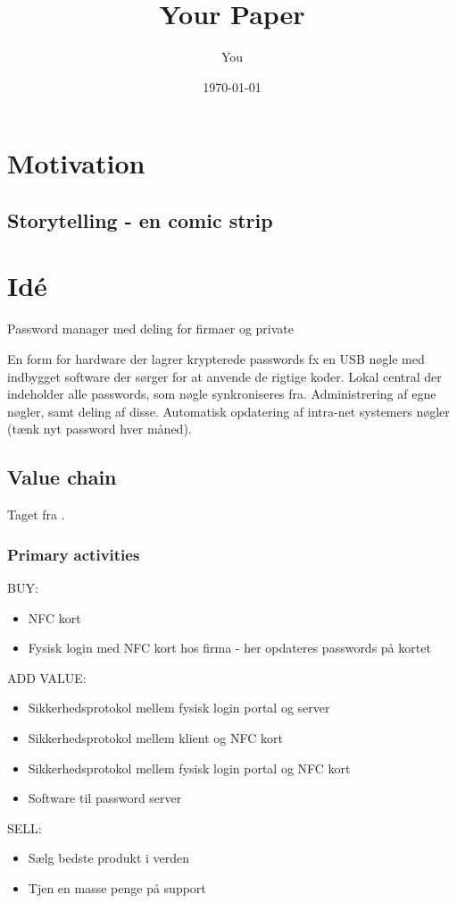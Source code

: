 \documentclass[a4paper]{article}
\title{Your Paper}
\author{You}
\date{\today}
\begin{document}
\maketitle

\section{Motivation}
\subsection{Storytelling - en comic strip}

\section{Idé}

Password manager med deling for firmaer og private

En form for hardware der lagrer krypterede passwords fx en USB nøgle med indbygget software der sørger for at anvende de rigtige koder.
Lokal central der indeholder alle passwords, som nøgle synkroniseres fra.
Administrering af egne nøgler, samt deling af disse.
Automatisk opdatering af intra-net systemers nøgler (tænk nyt password hver måned).

\subsection{Value chain}
Taget fra \citet[p.~12]{rose2012software}.
\subsubsection*{Primary activities}
BUY:
\begin{itemize}
\item NFC kort
\item Fysisk login med NFC kort hos firma - her opdateres passwords på kortet
\end{itemize}
ADD VALUE:
\begin{itemize}
\item Sikkerhedsprotokol mellem fysisk login portal og server
\item Sikkerhedsprotokol mellem klient og NFC kort
\item Sikkerhedsprotokol mellem fysisk login portal og NFC kort
\item Software til password server
\end{itemize}
SELL:
\begin{itemize}
\item Sælg bedste produkt i verden
\item Tjen en masse penge på support
\end{itemize}
\end{document}
